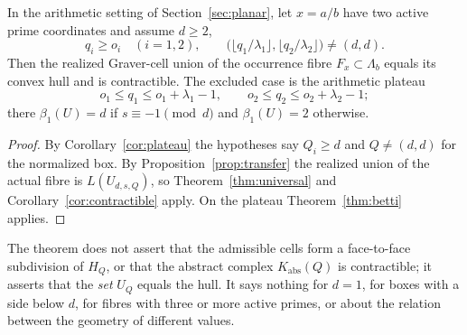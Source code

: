 \begin{corollary}\label{cor:actual}
In the arithmetic setting of Section~\ref{sec:planar}, let $x=a/b$ have two active prime coordinates and assume $d\ge2$,
\[
  q_i\ge o_i\quad(i=1,2),\qquad \bigl(\lfloor q_1/\lambda_1\rfloor,\lfloor q_2/\lambda_2\rfloor\bigr)\ne(d,d).
\]
Then the realized Graver-cell union of the occurrence fibre $F_x\subset\Lambda_b$ equals its convex hull and is contractible. The excluded case is the arithmetic plateau
\[
  o_1\le q_1\le o_1+\lambda_1-1,\qquad o_2\le q_2\le o_2+\lambda_2-1;
\]
there $\beta_1(U)=d$ if $s\equiv-1\pmod d$ and $\beta_1(U)=2$ otherwise.
\end{corollary}
\begin{proof}
By Corollary~\ref{cor:plateau} the hypotheses say $Q_i\ge d$ and $Q\ne(d,d)$ for the normalized box. By Proposition~\ref{prop:transfer} the realized union of the actual fibre is $L(U_{d,s,Q})$, so Theorem~\ref{thm:universal} and Corollary~\ref{cor:contractible} apply. On the plateau Theorem~\ref{thm:betti} applies.
\end{proof}

\begin{remark}
The theorem does not assert that the admissible cells form a face-to-face subdivision of $H_Q$, or that the abstract complex $K_{\mathrm{abs}}(Q)$ is contractible; it asserts that the \emph{set} $U_Q$ equals the hull. It says nothing for $d=1$, for boxes with a side below $d$, for fibres with three or more active primes, or about the relation between the geometry of different values.
\end{remark}
